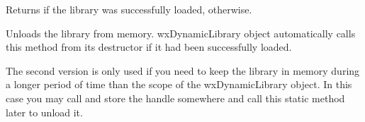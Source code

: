 Returns \true if the library was successfully loaded, \false otherwise.


\helpref{}{}


\label{wxdynamiclibraryunload}



Unloads the library from memory. wxDynamicLibrary object automatically calls
this method from its destructor if it had been successfully loaded.

The second version is only used if you need to keep the library in memory
during a longer period of time than the scope of the wxDynamicLibrary object.
In this case you may call  and store
the handle somewhere and call this static method later to unload it.


